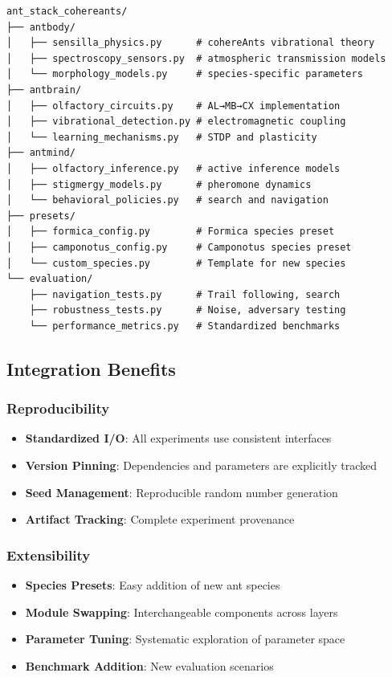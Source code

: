 \documentclass[
  13pt,
  a4paperpaper,
  12pt]{article}
\providecommand{\tightlist}{%
  \setlength{\itemsep}{0pt}\setlength{\parskip}{0pt}}
\begin{document}
\begin{lstlisting}
ant_stack_cohereants/
├── antbody/
│   ├── sensilla_physics.py      # cohereAnts vibrational theory
│   ├── spectroscopy_sensors.py  # atmospheric transmission models
│   └── morphology_models.py     # species-specific parameters
├── antbrain/
│   ├── olfactory_circuits.py    # AL→MB→CX implementation
│   ├── vibrational_detection.py # electromagnetic coupling
│   └── learning_mechanisms.py   # STDP and plasticity
├── antmind/
│   ├── olfactory_inference.py   # active inference models
│   ├── stigmergy_models.py      # pheromone dynamics
│   └── behavioral_policies.py   # search and navigation
├── presets/
│   ├── formica_config.py        # Formica species preset
│   ├── camponotus_config.py     # Camponotus species preset
│   └── custom_species.py        # Template for new species
└── evaluation/
    ├── navigation_tests.py      # Trail following, search
    ├── robustness_tests.py      # Noise, adversary testing
    └── performance_metrics.py   # Standardized benchmarks
\end{lstlisting}

\subsection{Integration Benefits}\label{integration-benefits}

\subsubsection{Reproducibility}\label{reproducibility}

\begin{itemize}
\tightlist
\item
  \textbf{Standardized I/O}: All experiments use consistent interfaces
\item
  \textbf{Version Pinning}: Dependencies and parameters are explicitly
  tracked
\item
  \textbf{Seed Management}: Reproducible random number generation
\item
  \textbf{Artifact Tracking}: Complete experiment provenance
\end{itemize}

\subsubsection{Extensibility}\label{extensibility}

\begin{itemize}
\tightlist
\item
  \textbf{Species Presets}: Easy addition of new ant species
\item
  \textbf{Module Swapping}: Interchangeable components across layers
\item
  \textbf{Parameter Tuning}: Systematic exploration of parameter space
\item
  \textbf{Benchmark Addition}: New evaluation scenarios
\end{itemize}
\end{document}
